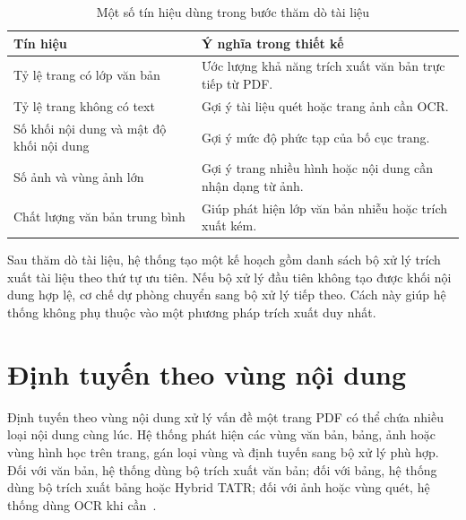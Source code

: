 \documentclass[../DoAn.tex]{subfiles}
\begin{document}
\begin{table}[H]
\centering
\small
\renewcommand{\arraystretch}{1.2}
\caption{Một số tín hiệu dùng trong bước thăm dò tài liệu}
\label{tab:probe-signals}
\begin{tabularx}{\textwidth}{
    |>{\raggedright\arraybackslash}p{}
    |>{\raggedright\arraybackslash}X|
}
\hline
\textbf{Tín hiệu} & \textbf{Ý nghĩa trong thiết kế} \\
\hline
Tỷ lệ trang có lớp văn bản &
Ước lượng khả năng trích xuất văn bản trực tiếp từ PDF. \\
\hline
Tỷ lệ trang không có text &
Gợi ý tài liệu quét hoặc trang ảnh cần OCR. \\
\hline
Số khối nội dung và mật độ khối nội dung &
Gợi ý mức độ phức tạp của bố cục trang. \\
\hline
Số ảnh và vùng ảnh lớn &
Gợi ý trang nhiều hình hoặc nội dung cần nhận dạng từ ảnh. \\
\hline
Chất lượng văn bản trung bình &
Giúp phát hiện lớp văn bản nhiễu hoặc trích xuất kém. \\
\hline
\end{tabularx}
\end{table}

Sau thăm dò tài liệu, hệ thống tạo một kế hoạch  gồm danh sách bộ xử lý trích xuất tài liệu theo thứ tự ưu
tiên. Nếu bộ xử lý đầu tiên không tạo được khối nội dung hợp lệ, cơ chế dự phòng chuyển
sang bộ xử lý tiếp theo. Cách này giúp hệ thống không phụ thuộc vào một phương
pháp trích xuất duy nhất.

\section{Định tuyến theo vùng nội dung}
\label{section:region-routing-design-revised}

Định tuyến theo vùng nội dung xử lý vấn đề một trang PDF có thể chứa nhiều loại
nội dung cùng lúc. Hệ thống phát hiện các vùng văn bản, bảng, ảnh hoặc vùng
hình học trên trang, gán loại vùng và định tuyến sang bộ xử lý phù hợp. Đối với
văn bản, hệ thống dùng bộ trích xuất văn bản; đối với bảng, hệ thống dùng bộ
trích xuất bảng hoặc Hybrid TATR; đối với ảnh hoặc vùng quét, hệ thống dùng
OCR khi cần~\cite{du2020ppocr}.
\end{document}
